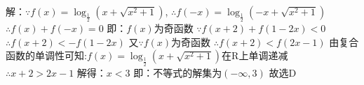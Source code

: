 解：$\because f(x)=\log_{\frac{1}{2}}{(x+\sqrt{x^2+1})}$, $\therefore f(-x)=\log_{\frac{1}{2}}{(-x+\sqrt{x^2+1})}$
$\therefore f(x)+f(-x)=0$
即：$f(x)$为奇函数
$\because f(x+2)+f(1-2x)<0$
$\therefore f(x+2)<-f(1-2x)$
又$\because f(x)$为奇函数
$\therefore f(x+2)<f(2x-1)$
由复合函数的单调性可知:$f(x)=\log_{\frac{1}{2}}{(x+\sqrt{x^2+1})}$在R上单调递减
$\therefore x+2>2x-1$ 解得：$x<3$
即：不等式的解集为$(-\infty , 3)$
故选D


